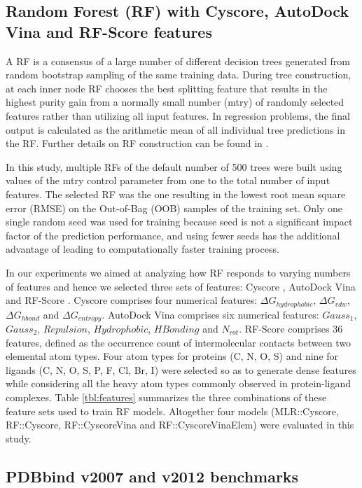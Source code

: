 \documentclass[linenumbers]{bmcart}
\begin{document}
\subsection*{Random Forest (RF) with Cyscore, AutoDock Vina and RF-Score features}

A RF \cite{1309} is a consensus of a large number of different decision trees generated from random bootstrap sampling of the same training data. During tree construction, at each inner node RF chooses the best splitting feature that results in the highest purity gain from a normally small number (mtry) of randomly selected features rather than utilizing all input features. In regression problems, the final output is calculated as the arithmetic mean of all individual tree predictions in the RF. Further details on RF construction can be found in \cite{564,1362}.

In this study, multiple RFs of the default number of 500 trees were built using values of the mtry control parameter from one to the total number of input features. The selected RF was the one resulting in the lowest root mean square error (RMSE) on the Out-of-Bag (OOB) samples of the training set. Only one single random seed was used for training because seed is not a significant impact factor of the prediction performance, and using fewer seeds has the additional advantage of leading to computationally faster training process.

In our experiments we aimed at analyzing how RF responds to varying numbers of features and hence we selected three sets of features: Cyscore \cite{1372}, AutoDock Vina \cite{595} and RF-Score \cite{564}. Cyscore comprises four numerical features: $\Delta G_{hydrophobic}$, $\Delta G_{vdw}$, $\Delta G_{hbond}$ and $\Delta G_{entropy}$. AutoDock Vina comprises six numerical features: $Gauss_1$, $Gauss_2$, $Repulsion$, $Hydrophobic$, $HBonding$ and $N_{rot}$. RF-Score comprises 36 features, defined as the occurrence count of intermolecular contacts between two elemental atom types. Four atom types for proteins (C, N, O, S) and nine for ligands (C, N, O, S, P, F, Cl, Br, I) were selected so as to generate dense features while considering all the heavy atom types commonly observed in protein-ligand complexes. Table \ref{tbl:features} summarizes the three combinations of these feature sets used to train RF models. Altogether four models (MLR::Cyscore, RF::Cyscore, RF::CyscoreVina and RF::CyscoreVinaElem) were evaluated in this study.

\subsection*{PDBbind v2007 and v2012 benchmarks}
\end{document}
